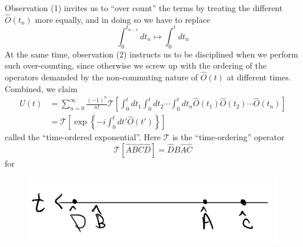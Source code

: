 Observation (1) invites us to ``over count'' the terms by treating the different $\hat{O}(t_n)$ more equally, and in doing so we have to replace
\[ \int_0^{t_{n-1}}{dt_n}\mapsto \int_0^t{dt_n}\]
At the same time, observation (2) instructs us to be disciplined when we perform such over-counting, since otherwise we screw up with the ordering of the operators demanded by the non-commuting nature of $\hat{O}(t)$ at different times. Combined, we claim
\begin{align*}
    \hat{U}\left( t \right) &=\sum_{n=0}^{\infty}{\frac{\left( -1 \right) ^n}{n!}\mathcal{T} \left[ \int_0^t{dt_1\int_0^t{dt_2}\cdots \int_0^t{dt_n\hat{O}\left( t_1 \right) \hat{O}\left( t_2 \right) \cdots \hat{O}\left( t_n \right)}} \right]}\\
    &=\mathcal{T} \left[ \exp \left\{ -i\int_0^t{dt'\hat{O}\left( t' \right)} \right\} \right]
\end{align*}
called the ``time-ordered exponential''. Here $\mathcal{T}$ is the ``time-ordering'' operator
\[ \mathcal{T} \left[ \hat{A}\hat{B}\hat{C}\hat{D} \right] =\hat{D}\hat{B}\hat{A}\hat{C}\]
for
\begin{figure}[ht]
    \centering
    \includegraphics[width=\textwidth]{jupyterbook/data/fig/lec08-fig01.png}
\end{figure}
